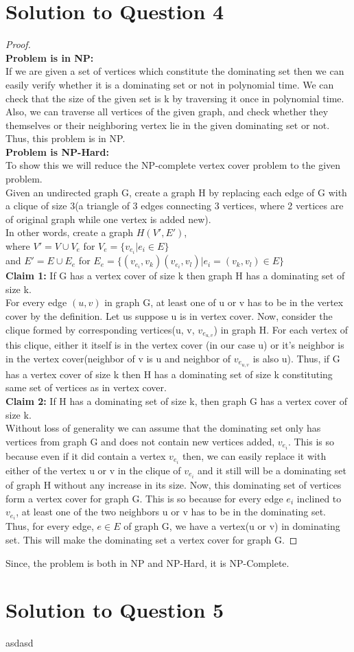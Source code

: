 \documentclass[11pt]{article}
\begin{document}
\section{Solution to Question 4}
\begin{proof}\\
  \textbf{Problem is in NP:} \\
   If we are given a set of vertices which constitute the dominating set then we can easily verify whether it is a dominating set or not in polynomial time. We can check that the size of the given set is k by traversing it once in polynomial time. Also, we can traverse all vertices of the given graph, and check whether they themselves or their neighboring vertex lie in the given dominating set or not.
   Thus, this problem is in NP. \\
  \textbf{Problem is NP-Hard:} \\
   To show this we will reduce the NP-complete vertex cover problem to the given problem. \\
   Given an undirected graph G, create a graph H by replacing each edge of G with a clique of size 3(a triangle of 3 edges connecting 3 vertices, where 2 vertices are of original graph while one vertex is added new).\\ In other words, create a graph $H(V', E')$, \\ where $V' = V \cup V_e$ for $V_e = \{v_{e_i}|e_i \in E\}$ \\
   and $E' = E \cup E_e$ for $E_e = \{(v_{e_i},v_k)(v_{e_i},v_l)|e_i = (v_k, v_l) \in E\}$ \\
   \textbf{Claim 1:} If G has a vertex cover of size k then graph H has a dominating set of size k. \\
   For every edge $(u, v)$ in graph G, at least one of u or v has to be in the vertex cover by the definition. Let us suppose u is in vertex cover. Now, consider the clique formed by corresponding vertices(u, v, $v_{e_{u,v}}$) in graph H. For each vertex of this clique, either it itself is in the vertex cover (in our case u) or it's neighbor is in the vertex cover(neighbor of v is u and neighbor of $v_{e_{u,v}}$ is also u). Thus, if G has a vertex cover of size k then H has a dominating set of size k constituting same set of vertices as in vertex cover.\\  
   \textbf{Claim 2:} If H has a dominating set of size k, then graph G has a vertex cover of size k.\\
   Without loss of generality we can assume that the dominating set only has vertices from graph G and does not contain new vertices added, $v_{e_i}$. This is so because even if it did contain a vertex $v_{e_i}$ then, we can easily replace it with either of the vertex u or v in the clique of $v_{e_i}$ and it still will be a dominating set of graph H without any increase in its size. Now, this dominating set of vertices form a vertex cover for graph G. This is so because for every edge $e_i$ inclined to $v_{e_i}$, at least one of the two neighbors u or v has to be in the dominating set. Thus, for every edge, $e \in E$ of graph G, we have a vertex(u or v) in dominating set. This will make the dominating set a vertex cover for graph G.
   \end{proof}
   Since, the problem is both in NP and NP-Hard, it is NP-Complete.

\newpage
\section{Solution to Question 5} 
asdasd
\end{document}
